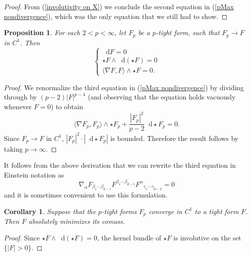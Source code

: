 \documentclass[reqno,11pt]{amsart}
\newcommand*\dif{\mathop{}\!\mathrm{d}}
\newcommand*\Dif{\mathop{}\!\mathrm{D}}
\newtheorem{proposition}[theorem]{Proposition}
\newtheorem{corollary}[theorem]{Corollary}
\theoremstyle{definition}
\numberwithin{equation}{section}
\begin{document}
\begin{proof}
From (\ref{involutivity on X}) we conclude the second equation in (\ref{pMax nondivergence}), which was the only equation that we still had to show.
\end{proof}

\begin{proposition}
For each $2 < p < \infty$, let $F_p$ be a $p$-tight form, such that $F_p \to F$ in $C^1$.
Then
$$\begin{cases}
    \dif F = 0 \\
    \star F \wedge \dif(\star F) = 0 \\
    \langle \nabla F, F\rangle \wedge \star F = 0.
\end{cases}$$
\end{proposition}
\begin{proof}
We renormalize the third equation in (\ref{pMax nondivergence}) by dividing through by $(p - 2) |F|^{p - 4}$ (and observing that the equation holds vacuously whenever $F = 0$) to obtain 
$$\langle \nabla F_p, F_p\rangle \wedge \star F_p + \frac{|F_p|^2}{p - 2} \dif \star F_p = 0.$$
Since $F_p \to F$ in $C^1$, $|F_p|^2 \cdot |\dif \star F_p|$ is bounded.
Therefore the result follows by taking $p \to \infty$.
\end{proof}

It follows from the above derivation that we can rewrite the third equation in Einstein notation as
$$\nabla_\alpha F_{\beta_1 \cdots \beta_{d - 1}} F^{\beta_1 \cdots \beta_{d - 1}} {F^\alpha}_{\gamma_1 \cdots \gamma_{d - 2}} = 0$$
and it is sometimes convenient to use this formulation.

\begin{corollary}
Suppose that the $p$-tight forms $F_p$ converge in $C^1$ to a tight form $F$.
Then $F$ absolutely minimizes its comass.
\end{corollary}
\begin{proof}
Since $\star F \wedge \dif(\star F) = 0$, the kernel bundle of $\star F$ is involutive on the set $\{|F| > 0\}$.
\end{proof}


\end{document}
